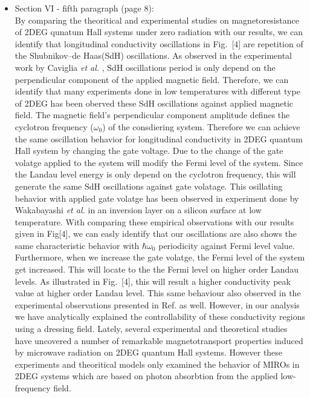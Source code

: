 \documentclass{article}
\begin{document}
\begin{itemize}
{  }
  \item Section VI - fifth paragraph (page 8):\\
  {\color{Maroon}
  By comparing the theoritical \cite{ando72,ando74_1,ando74_2,ando74_3,ando74_4,ando82,endo09} and experimental \cite{endo09,wakabayashi78,ochiai190,mancoff96,arapov02,grbic04,caviglia10} studies on magnetoresistance of 2DEG qunatum Hall systems under zero radiation with our results, we can identify that longitudinal conductivity oscillations in Fig.~[4] are repetition of the Shubnikov–de Haas(SdH) oscillations.
  As observed in the experimental work by Caviglia \textit{et al.} \cite{caviglia10}, SdH oscillations period is only depend on the perpendicular component of the applied magnetic field.
  Therefore, we can identify that many experiments done in low temperatures \cite{endo09,ochiai190,mancoff96,arapov02,grbic04,caviglia10} with different type of 2DEG has been oberved these SdH oscillations against applied magnetic field.
  The magnetic field's perpendicular component amplitude defines the cyclotron frequency ($\omega_0$) of the consdiering system.
  Therefore we can achieve the same oscillation behavior for longitudinal conductivity in 2DEG quantum Hall system by changing the gate voltage. Due to the change of the gate volatge applied to the system will modify the Fermi level of the system.
  Since the Landau level energy is only depend on the cyclotron frequency, this will generate the same SdH oscillations against gate volatage.
  This osillating behavior with applied gate volatge has been observed in experiment done by Wakabayashi \textit{et al.} \cite{wakabayashi78} in an inversion layer on a silicon surface at low temperature. With comparing these empirical observations with our results given in Fig[4], we can easly identify that our oscillations are also shows the same characteristic behavior with $\hbar\omega_0$ periodicity against Fermi level value. Furthermore, when we increase the gate volatge, the Fermi level of the system get increased. This will locate to the the Fermi level on higher order Landau levels. As illustrated in Fig.~[4], this will result a higher conductivity peak value at higher order Landau level. This same behaviour also observed in the experimental observations presented in Ref. \cite{wakabayashi78} as well. However, in our analysis we have analytically explained the controllability of these conductivity regions using a dressing field.
  Lately, several experimental \cite{zudov01,mani02,zudov03,mani04} and theoretical \cite{durst03,dmitriev03,dmitriev05,dmitriev09} studies have uncovered a number of remarkable magnetotransport properties induced by microwave radiation on 2DEG quantum Hall systems. However these experiments and theoritical models only examined the behavior of MIROs in 2DEG systems which are based on photon absorbtion from the applied low-frequency field.
}
\end{itemize}
\end{document}
